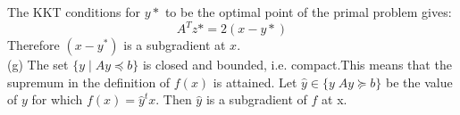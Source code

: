 \documentclass{article}
\begin{document}
The KKT conditions for $y*$ to be the optimal point of the primal problem gives:
$$
A^T z* = 2(x - y*)
$$
Therefore $(x - y^*)$ is a subgradient at $x.$\\

(g) The set $\{y \;| \; Ay \preceq b \} $ is closed and bounded, i.e. compact.This means that
the supremum in the definition of $f(x)$ is attained.
Let $\hat y \in \{y\; A y \succeq b\}$ be the value of $y$ for which $f(x) = \hat y^t x.$ Then $\hat y$ is a subgradient of $f$ at x.





  
 
 


 
 
 
\end{document}
